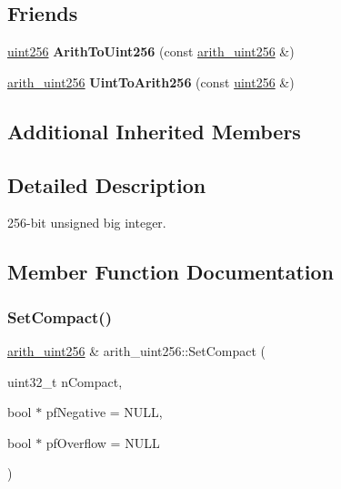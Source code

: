\subsection*{Friends}
\begin{DoxyCompactItemize}
\item 
\mbox{\label{classarith__uint256_aef075fd8d1a7e5937e9775b8e82c8a1b}} 
\mbox{\hyperlink{classuint256}{uint256}} {\bfseries Arith\+To\+Uint256} (const \mbox{\hyperlink{classarith__uint256}{arith\+\_\+uint256}} \&)
\item 
\mbox{\label{classarith__uint256_a9c9f84c20851f10a8ca5082bec97666a}} 
\mbox{\hyperlink{classarith__uint256}{arith\+\_\+uint256}} {\bfseries Uint\+To\+Arith256} (const \mbox{\hyperlink{classuint256}{uint256}} \&)
\end{DoxyCompactItemize}
\subsection*{Additional Inherited Members}


\subsection{Detailed Description}
256-\/bit unsigned big integer. 

\subsection{Member Function Documentation}
\mbox{\label{classarith__uint256_a458133c9f123519646b07e6143f2164f}} 
\subsubsection{\texorpdfstring{Set\+Compact()}{SetCompact()}}
{\footnotesize\ttfamily \mbox{\hyperlink{classarith__uint256}{arith\+\_\+uint256}} \& arith\+\_\+uint256\+::\+Set\+Compact (\begin{DoxyParamCaption}\item[{uint32\+\_\+t}]{n\+Compact,  }\item[{bool $\ast$}]{pf\+Negative = {\ttfamily NULL},  }\item[{bool $\ast$}]{pf\+Overflow = {\ttfamily NULL} }\end{DoxyParamCaption})}

